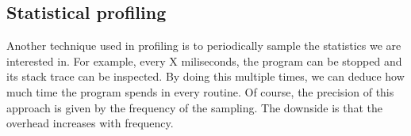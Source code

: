 


\subsection{Statistical profiling}
\label{subsection:statisticalprofiling}

Another technique used in profiling is to periodically sample the statistics we are interested in. For example, every X miliseconds, the program can be stopped and its stack trace can be inspected. By doing this  multiple times, we can deduce how much time the program spends in every routine. Of course, the precision of this approach is given by the frequency of the sampling. The downside is that the overhead increases with frequency.


